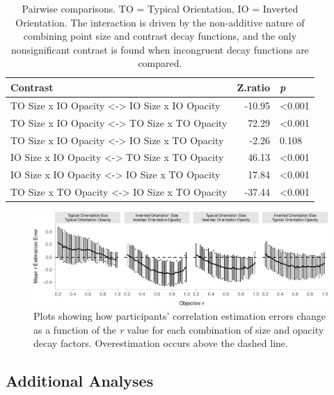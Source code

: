 \documentclass[manuscript, review, anonymous, screen]{acmart}
\begin{document}
\hypertarget{tbl-contrasts}{}
\begin{table}
\caption{\label{tbl-contrasts}Pairwise comparisons. TO = Typical Orientation, IO = Inverted
Orientation. The interaction is driven by the non-additive nature of
combining point size and contrast decay functions, and the only
nonsignificant contrast is found when incongruent decay functions are
compared. }\tabularnewline

\centering
\begin{tabular}{lrl}
\toprule
Contrast & Z.ratio & \textit{p}\\
\midrule
TO Size x IO Opacity <-> IO Size x IO Opacity & -10.95 & <0.001\\
TO Size x IO Opacity <-> TO Size x TO Opacity & 72.29 & <0.001\\
TO Size x IO Opacity <-> IO Size x TO Opacity & -2.26 & 0.108\\
IO Size x IO Opacity <-> TO Size x TO Opacity & 46.13 & <0.001\\
IO Size x IO Opacity <-> IO Size x TO Opacity & 17.84 & <0.001\\
\addlinespace
TO Size x TO Opacity <-> IO Size x TO Opacity & -37.44 & <0.001\\
\bottomrule
\end{tabular}
\end{table}

\begin{figure}

{\centering \includegraphics[width=1\textwidth,height=\textheight]{size_and_opacity_files/figure-pdf/fig-diff-error-bars-plot-1.pdf}

}

\caption{\label{fig-diff-error-bars-plot}Plots showing how participants'
correlation estimation errors change as a function of the \emph{r} value
for each combination of size and opacity decay factors. Overestimation
occurs above the dashed line.}

\end{figure}

\hypertarget{sec-add-analyses}{%
\subsection{Additional Analyses}\label{sec-add-analyses}}
\end{document}
